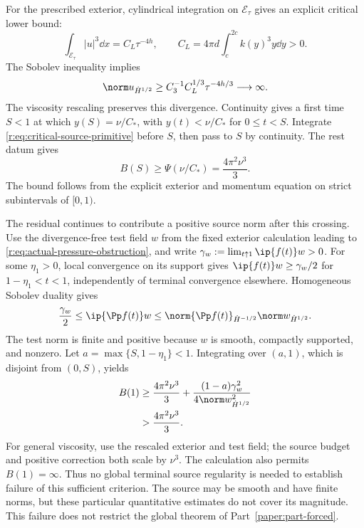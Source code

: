 For the prescribed exterior, cylindrical integration on
\(\mathcal E_\tau\) gives an explicit critical lower bound:
\[
 \int_{\mathcal E_\tau}|u|^3\dd x
 =C_L\tau^{-4h},\qquad
 C_L=4\pi d\int_c^{2c}k(y)^3y\dd y>0.
\]
The Sobolev inequality implies
\[
 \norm u_{\dot H^{1/2}}
 \ge C_3^{-1}C_L^{1/3}\tau^{-4h/3}\longrightarrow\infty.
\]
The viscosity rescaling preserves this divergence. Continuity gives a first
time \(S<1\) at which
\(y(S)=\nu/C_*\), with \(y(t)<\nu/C_*\) for \(0\le t<S\).
Integrate \eqref{r:eq:critical-source-primitive} before \(S\), then pass to
\(S\) by continuity. The rest datum gives
\begin{equation}
 B(S)\ge\Psi(\nu/C_*)=\frac{4\pi^2\nu^3}{3}.
 \label{r:eq:necessary-source-budget}
\end{equation}
The bound follows from the explicit exterior and momentum equation on
strict subintervals of \([0,1)\).

The residual continues to contribute a positive source norm after this
crossing. Use the divergence-free test field \(w\) from the fixed
exterior calculation leading to \eqref{r:eq:actual-pressure-obstruction},
and write \(\gamma_w:=\lim_{t\uparrow1}\ip{f(t)}w>0\).
For some \(\eta_1>0\), local convergence on its support gives
\(\ip{f(t)}w\ge\gamma_w/2\) for \(1-\eta_1<t<1\), independently
of terminal convergence elsewhere. Homogeneous Sobolev duality gives
\[
 \frac{\gamma_w}{2}\le\ip{\Pp f(t)}w
 \le\norm{\Pp f(t)}_{\dot H^{-1/2}}\norm w_{\dot H^{1/2}}.
\]
The test norm is finite and positive because \(w\) is smooth, compactly
supported, and nonzero. Let \(a=\max\{S,1-\eta_1\}<1\).
Integrating over \((a,1)\), which is disjoint from \((0,S)\), yields
\begin{equation}
 \begin{aligned}
 B(1)&\ge\frac{4\pi^2\nu^3}{3}
       +\frac{(1-a)\gamma_w^2}{4\norm w_{\dot H^{1/2}}^2}\\
     &>\frac{4\pi^2\nu^3}{3}.
 \end{aligned}
 \label{r:eq:strict-critical-budget-failure}
\end{equation}
For general viscosity, use the rescaled exterior and test field; the
source budget and positive correction both scale by \(\nu^3\).
The calculation also permits \(B(1)=\infty\). Thus no global terminal
source regularity is needed to establish failure of this sufficient
criterion. The source may be smooth and have finite norms, but these
particular quantitative estimates do not cover its magnitude. This failure
does not restrict the global theorem of Part~\ref{paper:part-forced}.
